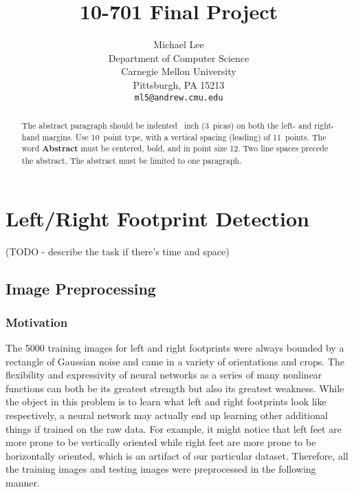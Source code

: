 \documentclass{article}
\title{10-701 Final Project}
\author{
  Michael Lee \\
  Department of Computer Science\\
  Carnegie Mellon University\\
  Pittsburgh, PA 15213 \\
  \texttt{ml5@andrew.cmu.edu} \\
}
\begin{document}

\maketitle

\begin{abstract}
  The abstract paragraph should be indented ~inch
  (3~picas) on both the left- and right-hand margins. Use 10~point
  type, with a vertical spacing (leading) of 11~points.  The word
  \textbf{Abstract} must be centered, bold, and in point size 12. Two
  line spaces precede the abstract. The abstract must be limited to
  one paragraph.
\end{abstract}

\section{Left/Right Footprint Detection}

(TODO - describe the task if there's time and space)

\subsection{Image Preprocessing}
\subsubsection{Motivation}
The 5000 training images for left and right footprints were always bounded by a rectangle of Gaussian noise and came in a variety of orientations and crops. The flexibility and expressivity of neural networks as a series of many nonlinear functions can both be its greatest strength but also its greatest weakness. While the object in this problem is to learn what left and right footprints look like respectively, a neural network may actually end up learning other additional things if trained on the raw data. For example, it might notice that left feet are more prone to be vertically oriented while right feet are more prone to be horizontally oriented, which is an artifact of our particular dataset. Therefore, all the training images and testing images were preprocessed in the following manner.
\end{document}
